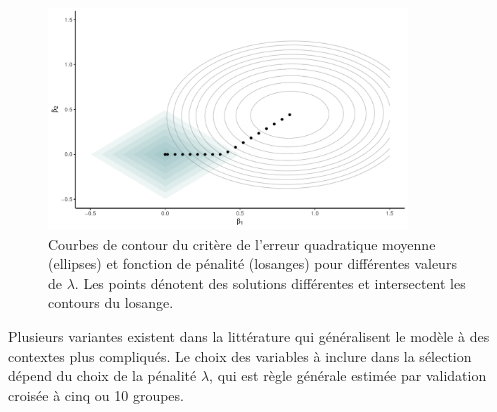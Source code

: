 \documentclass[
  11pt,
  letterpaper,
]{scrbook}
\theoremstyle{definition}
\theoremstyle{remark}
\begin{document}
\begin{figure}[ht!]

{\centering \includegraphics[width=0.85\textwidth,height=\textheight]{selectionmodeles_files/figure-pdf/fig-lassopenalty-1.pdf}

}

\caption{\label{fig-lassopenalty}Courbes de contour du critère de
l'erreur quadratique moyenne (ellipses) et fonction de pénalité
(losanges) pour différentes valeurs de \(\lambda\). Les points dénotent
des solutions différentes et intersectent les contours du losange.}

\end{figure}

Plusieurs variantes existent dans la littérature qui généralisent le
modèle à des contextes plus compliqués. Le choix des variables à inclure
dans la sélection dépend du choix de la pénalité \(\lambda\), qui est
règle générale estimée par validation croisée à cinq ou 10 groupes.
\end{document}
